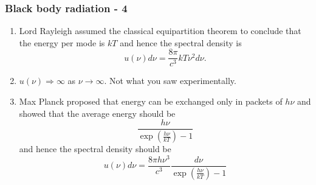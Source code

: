 \documentclass{beamer}
\begin{document}
\begin{frame}
\frametitle{Black body radiation - 4}
\begin{enumerate}
\item Lord Rayleigh assumed the classical equipartition theorem to conclude that
the energy per mode is $kT$ and hence the spectral density is
\begin{equation}\label{e7}
u(\nu)d\nu = \frac{8\pi}{c^3} kT \nu^2 d\nu.
\end{equation}
\item $u(\nu) \Rightarrow \infty$ as $\nu \rightarrow \infty$. Not what you 
saw experimentally.
\item Max Planck proposed that energy can be exchanged only in packets of
$h\nu$ and showed that the average energy should be
\[
\frac{h\nu}{\exp\left(\frac{h\nu}{kT}\right) - 1}
\] 
and hence the spectral density should be
\begin{equation}\label{e8}
u(\nu)d\nu = 
   \frac{8\pi h\nu^3}{c^3}\frac{d\nu}{\exp\left(\frac{h\nu}{kT}\right) - 1}
\end{equation}
\end{enumerate}
\end{frame}
\end{document}
